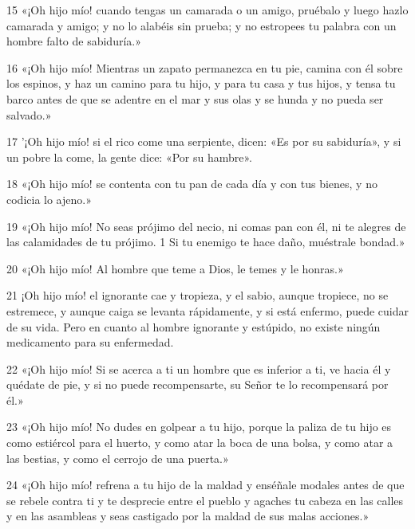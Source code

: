 \par 15 «¡Oh hijo mío! cuando tengas un camarada o un amigo, pruébalo y luego hazlo camarada y amigo; y no lo alabéis sin prueba; y no estropees tu palabra con un hombre falto de sabiduría.»

\par 16 «¡Oh hijo mío! Mientras un zapato permanezca en tu pie, camina con él sobre los espinos, y haz un camino para tu hijo, y para tu casa y tus hijos, y tensa tu barco antes de que se adentre en el mar y sus olas y se hunda y no pueda ser salvado.»

\par 17 '¡Oh hijo mío! si el rico come una serpiente, dicen: «Es por su sabiduría», y si un pobre la come, la gente dice: «Por su hambre».

\par 18 «¡Oh hijo mío! se contenta con tu pan de cada día y con tus bienes, y no codicia lo ajeno.»

\par 19 «¡Oh hijo mío! No seas prójimo del necio, ni comas pan con él, ni te alegres de las calamidades de tu prójimo. 1 Si tu enemigo te hace daño, muéstrale bondad.»

\par 20 «¡Oh hijo mío! Al hombre que teme a Dios, le temes y le honras.»

\par 21 ¡Oh hijo mío! el ignorante cae y tropieza, y el sabio, aunque tropiece, no se estremece, y aunque caiga se levanta rápidamente, y si está enfermo, puede cuidar de su vida. Pero en cuanto al hombre ignorante y estúpido, no existe ningún medicamento para su enfermedad.

\par 22 «¡Oh hijo mío! Si se acerca a ti un hombre que es inferior a ti, ve hacia él y quédate de pie, y si no puede recompensarte, su Señor te lo recompensará por él.»

\par 23 «¡Oh hijo mío! No dudes en golpear a tu hijo, porque la paliza de tu hijo es como estiércol para el huerto, y como atar la boca de una bolsa, y como atar a las bestias, y como el cerrojo de una puerta.»

\par 24 «¡Oh hijo mío! refrena a tu hijo de la maldad y enséñale modales antes de que se rebele contra ti y te desprecie entre el pueblo y agaches tu cabeza en las calles y en las asambleas y seas castigado por la maldad de sus malas acciones.»

